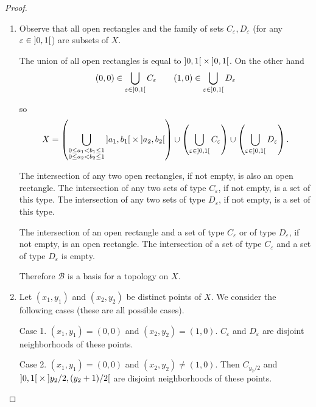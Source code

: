 \begin{proof}
	\begin{enumerate}[label={(\alph*)}]
		\item Observe that all open rectangles and the family of sets $C_{\varepsilon}, D_{\varepsilon}$ (for any $\varepsilon \in \left]{0,1}\right[$) are subsets of $X$.

		      The union of all open rectangles is equal to $\left]{0,1}\right[\times\left]{0,1}\right[$. On the other hand
		      \begin{align*}
			      (0, 0) \in \bigcup_{\varepsilon\in\left]{0,1}\right[}C_{\varepsilon} \qquad
			      (1, 0) \in \bigcup_{\varepsilon\in\left]{0,1}\right[}D_{\varepsilon}
		      \end{align*}

		      so
		      \begin{align*}
			      X = \left(\bigcup_{\substack{ 0\leq a_{1} < b_{1}\leq 1 \\ 0\leq a_{2} < b_{2}\leq 1 }} \left]{a_{1}, b_{1}}\right[ \times \left]{a_{2}, b_{2}}\right[\right) \cup \left(\bigcup_{\varepsilon\in\left]{0,1}\right[}C_{\varepsilon}\right) \cup \left(\bigcup_{\varepsilon\in\left]{0,1}\right[}D_{\varepsilon}\right).
		      \end{align*}

		      The intersection of any two open rectangles, if not empty, is also an open rectangle. The intersection of any two sets of type $C_{\varepsilon}$, if not empty, is a set of this type. The intersection of any two sets of type $D_{\varepsilon}$, if not empty, is a set of this type.

		      The intersection of an open rectangle and a set of type $C_{\varepsilon}$ or of type $D_{\varepsilon}$, if not empty, is an open rectangle. The intersection of a set of type $C_{\varepsilon}$ and a set of type $D_{\varepsilon}$ is empty.

		      Therefore $\mathscr{B}$ is a basis for a topology on $X$.
		\item Let $(x_{1}, y_{1})$ and $(x_{2}, y_{2})$ be distinct points of $X$. We consider the following cases (these are all possible cases).

		      Case 1. $(x_{1}, y_{1}) = (0, 0)$ and $(x_{2}, y_{2}) = (1, 0)$. $C_{\varepsilon}$ and $D_{\varepsilon}$ are disjoint neighborhoods of these points.

		      Case 2. $(x_{1}, y_{1}) = (0, 0)$ and $(x_{2}, y_{2})\ne (1, 0)$. Then $C_{y_{2}/2}$ and $\left]{0, 1}\right[\times\left]{y_{2}/2, (y_{2}+1)/2}\right[$ are disjoint neighborhoods of these points.


\end{enumerate}
\end{proof}
